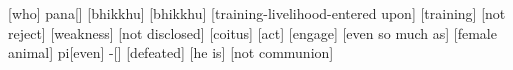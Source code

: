 [who] pana[] [bhikkhu] [bhikkhu] [training-livelihood-entered upon] [training] [not reject] [weakness] [not disclosed] [coitus] [act] [engage] [even so much as] [female animal] pi[even] -[] [defeated] [he is] [not communion] 